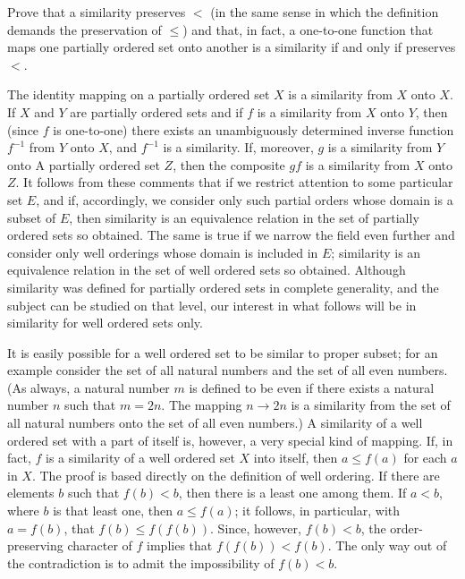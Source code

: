 \begin{named}[Exercise. ] Prove that a similarity preserves $<$ (in the same sense in which the definition demands the preservation of $\le$) and that, in fact, a one-to-one function that maps one partially ordered set onto another is a similarity if and only if preserves $<$.
\end{named}

The identity mapping on a partially ordered set $X$ is a similarity from $X$ onto $X$. If $X$ and $Y$ are partially ordered sets and if $f$ is a similarity from $X$ onto $Y$, then (since $f$ is one-to-one) there exists an unambiguously determined inverse function $f^{-1}$ from $Y$ onto $X$, and $f^{-1}$ is a similarity. If, moreover, $g$ is a similarity from $Y$ onto A partially ordered set $Z$, then the composite $gf$ is a similarity from $X$ onto $Z$. It follows from these comments that if we restrict attention to some particular set $E$, and if, accordingly, we consider only such partial orders whose domain is a subset of $E$, then similarity is an equivalence relation in the set of partially ordered sets so obtained. The same is true if we narrow the field even further and consider only well orderings whose domain is included in $E$; similarity is an equivalence relation in the set of well ordered sets so obtained. Although similarity was defined for partially ordered sets in complete generality, and the subject can be studied on that level, our interest in what follows will be in similarity for well ordered sets only. 

It is easily possible for a well ordered set to be similar to proper subset; for an example consider the set of all natural numbers and the set of all even numbers. (As always, a natural number $m$ is defined to be even if there exists a natural number $n$ such that $m = 2n$. The mapping $n \rightarrow 2n$ is a similarity from the set of all natural numbers onto the set of all even numbers.) A similarity of a well ordered set with a part of itself is, however, a very special kind of mapping. If, in fact, $f$ is a similarity of a well ordered set $X$ into itself, then $a \le f(a)$ for each $a$ in $X$. The proof is based directly on the definition of well ordering. If there are elements $b$ such that $f(b) < b$, then there is a least one among them. If $a < b$, where $b$ is that least one, then $a \le f(a)$; it follows, in particular, with $a = f(b)$, that $f(b) \le f(f(b))$. Since, however, $f(b) < b$, the order-preserving character of $f$ implies that $f(f(b)) < f(b)$. The only way out of the contradiction is to admit the impossibility of $f(b) < b$. 

